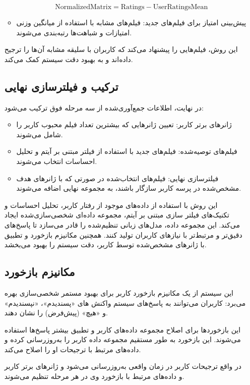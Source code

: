 \begin{enumerate}
\begin{itemize}
 
\begin{equation}
	\label{eq:NormalizedMatrix}
	\text{NormalizedMatrix} = \text{Ratings} - \text{UserRatingsMean}
\end{equation}

\item
پیش‌بینی امتیاز برای فیلم‌های جدید: فیلم‌های مشابه با استفاده از میانگین وزنی امتیازات و شباهت‌ها رتبه‌بندی می‌شوند.
\end{itemize}


این روش، فیلم‌هایی را پیشنهاد می‌کند که کاربران با سلیقه مشابه آن‌ها را ترجیح داده‌اند و به بهبود دقت سیستم کمک می‌کند.

\subsection{ترکیب و فیلترسازی نهایی}
در نهایت، اطلاعات جمع‌آوری‌شده از سه مرحله فوق ترکیب می‌شود:
\begin{itemize}
\item
ژانرهای برتر کاربر: تعیین ژانرهایی که بیشترین تعداد فیلم محبوب کاربر را شامل می‌شوند.
\item
فیلم‌های توصیه‌شده:  فیلم‌های جدید با استفاده از فیلتر مبتنی بر آیتم و تحلیل احساسات انتخاب می‌شوند.
\item
فیلترسازی نهایی: فیلم‌های انتخاب‌شده در صورتی که با ژانرهای هدف مشخص‌شده در پرسه کاربر سازگار باشند، به مجموعه نهایی اضافه می‌شوند.
\end{itemize}

این روش با استفاده از داده‌های موجود از رفتار کاربر، تحلیل احساسات و تکنیک‌های فیلتر سازی مبتنی بر آیتم، مجموعه داده‌ای شخصی‌سازی‌شده ایجاد می‌کند. این مجموعه داده، مدل‌های زبانی تنظیم‌شده را قادر می‌سازد تا پاسخ‌های دقیق‌تر و مرتبط‌تر با نیازهای کاربران تولید کنند. همچنین مکانیزم بازخورد و تطبیق با ژانرهای مشخص‌شده توسط کاربر، دقت سیستم را بهبود می‌بخشد.

\subsection{مکانیزم بازخورد}
این سیستم از یک مکانیزم بازخورد کاربر برای بهبود مستمر شخصی‌سازی بهره می‌برد:
کاربران می‌توانند به پاسخ‌های سیستم واکنش های «پسندیدم»، «نپسندیدم» و «هیچ» (پیش‌فرض) را نشان دهند.


این بازخورد‌ها برای اصلاح مجموعه داده‌های کاربر و تطبیق بیشتر پاسخ‌ها استفاده می‌شوند.
این بازخورد به طور مستقیم مجموعه داده کاربر را به‌روزرسانی کرده و داده‌های مرتبط با ترجیحات او را اصلاح می‌کند.


در واقع ترجیحات کاربر در زمان واقعی به‌روزرسانی می‌شود و ژانرهای برتر کاربر و داده‌های مرتبط با بازخورد وی در هر مرحله تنظیم می‌شوند.



\end{enumerate}
